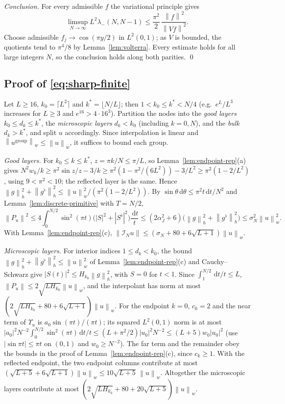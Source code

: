 \documentclass{siamart251216}
\newcommand{\norm}[1]{\left\lVert#1\right\rVert}
\newcommand{\dd}{\,\mathrm d}
\begin{document}
\emph{Conclusion.} For every admissible $f$ the variational principle gives
\[
 \limsup_{N\to\infty}L^2\lambda_-(N,N-1)\le\frac{\pi^2}2\,\frac{\norm f^2}{\norm{Vf}^2}.
\]
Choose admissible $f_j\to\cos(\pi y/2)$ in $L^2(0,1)$; as
$V$ is bounded, the quotients tend to $\pi^4/8$ by Lemma~\ref{lem:volterra}.
Every estimate holds for all large integers $N$, so the conclusion holds
along both parities. \qed

\subsection{\texorpdfstring{Proof of \eqref{eq:sharp-finite}}{Proof of the finite reverse bound}}

Let $L\ge16$, $k_0=\lceil L^2\rceil$ and $k^\ast=\lfloor N/L\rfloor$; then
$1<k_0\le k^\ast<N/4$ (e.g.\ $e^L/L^3$ increases for $L\ge3$ and
$e^{16}>4\cdot16^3$). Partition the nodes into the \emph{good layers}
$k_0\le d_k\le k^\ast$, the \emph{microscopic layers} $d_k<k_0$ (including
$k=0,N$), and the \emph{bulk} $d_k>k^\ast$, and split $u$ accordingly. Since
interpolation is linear and $\norm{u^{\mathrm{group}}}_w\le\norm u_w$, it
suffices to bound each group.

\emph{Good layers.} For $k_0\le k\le k^\ast$, $z=\pi k/N\le\pi/L$, so
Lemma~\ref{lem:endpoint-rep}(a) gives
$N^2w_k/k\ge\pi^2\sin z/z-3/k\ge\pi^2(1-\pi^2/(6L^2))-3/L^2\ge\pi^2(1-2/L^2)$,
using $9<\pi^2<10$; the reflected layer is the same. Hence
$\norm g_h^2+\norm{g^\flat}_h^2\le\norm u_w^2/(\pi^2(1-2/L^2))$. By
$\sin\theta\dd\theta\le\pi^2t\dd t/N^2$ and Lemma~\ref{lem:discrete-primitive}
with $T=N/2$,
\[
 \norm{P_u}^2\le4\int_0^{N/2}\sin^2(\pi t)\bigl(|S|^2+|S^\flat|^2\bigr)\frac{\dd t}t
 \le(2\alpha_J^2+6)\bigl(\norm g_h^2+\norm{g^\flat}_h^2\bigr)
 \le\sigma_N^2\norm u_w^2 .
\]
With Lemma~\ref{lem:endpoint-rep}(c),
$\norm{\mathcal I_Nu}\le(\sigma_N+80+6\sqrt{L+1})\norm u_w$.

\emph{Microscopic layers.} For interior indices $1\le d_k<k_0$, the bound
$\norm g_h^2+\norm{g^\flat}_h^2\le\norm u_w^2$ of
Lemma~\ref{lem:endpoint-rep}(c) and Cauchy--Schwarz give
$|S(t)|^2\le H_{k_0}\norm g_h^2$, with $S=0$ for $t<1$. Since
$\int_1^{N/2}\dd t/t\le L$, $\norm{P_u}\le2\sqrt{LH_{k_0}}\norm u_w$, and the
interpolant has norm at most $(2\sqrt{LH_{k_0}}+80+6\sqrt{L+1})\norm u_w$.
For the endpoint $k=0$, $c_0=2$ and the near term of $\Upsilon_u$ is
$a_0\sin(\pi t)/(\pi t)$; its squared $L^2(0,1)$ norm is at most
$|a_0|^2N^{-2}\int_0^{N/2}\sin^2(\pi t)\dd t/t\le(L+\pi^2/2)|u_0|^2N^{-2}
\le(L+5)w_0|u_0|^2$ (use $|\sin\pi t|\le\pi t$ on $(0,1)$ and $w_0\ge N^{-2}$).
The far term and the remainder obey the bounds in the proof of
Lemma~\ref{lem:endpoint-rep}(c), since $c_k\ge1$. With the reflected
endpoint, the two endpoint columns contribute at most
$(\sqrt{L+5}+6\sqrt{L+1})\norm u_w\le10\sqrt{L+5}\,\norm u_w$. Altogether the
microscopic layers contribute at most
$(2\sqrt{LH_{k_0}}+80+20\sqrt{L+5})\norm u_w$.
\end{document}
